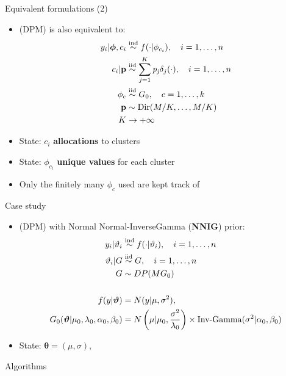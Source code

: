 \begin{frame}{Equivalent formulations (2)} %
	\begin{itemize}
		\item (DPM) is also equivalent to:
		\begin{align*}
		y_{i}|\boldsymbol{\phi},c_{i} &\stackrel{\text{ind}}{\sim} f(\cdot|\phi_{c_{i}}), \quad i=1,\dots,n \\
		c_{i}|\mathit{\mathbf{p}}&\stackrel{\text{iid}}{\sim} \sum_{j=1}^K\mathit{p_j} \delta_j(\cdot), \quad i=1,\dots,n \\
		\phi_{c} & \stackrel{\text{iid}}{\sim} G_{0}, \quad c=1,\dots,k \\
		\mathbf{p} &\sim \operatorname{Dir}(M/K,\dots,M/K) \\
		K &\to +\infty
		\end{align*}
		\item State: $c_i$ \textbf{allocations} to clusters
		\item State: $\phi_{c_i}$ \textbf{unique values} for each cluster
		\item Only the finitely many $\phi_{c}$ used are kept track of
	\end{itemize}

\end{frame}

\begin{frame}{Case study} %
	\begin{itemize}
		\item (DPM) with Normal Normal-InverseGamma (\textbf{NNIG}) prior:
		\begin{align*}
		y_i | \vartheta_i &\stackrel{\text{ind}}{\sim} f(\cdot|\vartheta_i), \quad i=1,\dots,n \\
		\vartheta_i | G &\stackrel{\text{iid}}{\sim} G, \quad i=1,\dots,n \\ 
		G &\sim DP(M G_0) \\
		\\
		f(y|\boldsymbol{\vartheta})&=N(y| \mu ,\sigma^2),  \\
		G_0(\boldsymbol{\vartheta}|\mu_0,\lambda_0, \alpha_0, 	\beta_0)
		&=N\left(\mu | \mu_0 ,\frac{\sigma^2} {\lambda_0}\right) \times \text{Inv-Gamma}(\sigma^2|\alpha_0, \beta_0 )
		\end{align*}
		\item State: $\boldsymbol\theta = (\mu,\sigma)$, 
	\end{itemize}
\end{frame}

\begin{frame}[c] %
	\begin{center}
		\huge \color{blue} Algorithms
	\end{center}
\end{frame}

